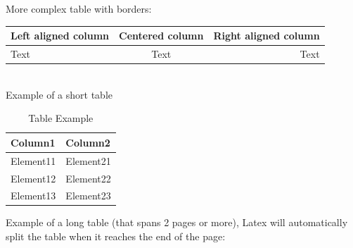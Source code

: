 More complex table with borders:
\\

\begin{tabular}{|l|c|r|} \hline
  Left aligned column & Centered column & Right aligned column \\ \hline
  Text & Text & Text \\ \hline
\end{tabular}
\\

Example of a short table


\begin{table}[H]
    \centering
    \begin{tabular}{|m{5cm}|m{10cm}|}
        \hline
          Column1 & Column2 \\
        \hline
          Element11 & Element21 \\
        \hline
          Element12 & Element22 \\
        \hline
          Element13 & Element23 \\
        \hline
    \end{tabular}
    \caption{Table Example}
\end{table}


Example of a long table (that spans 2 pages or more), Latex will automatically split the table when it reaches the end of the page:

